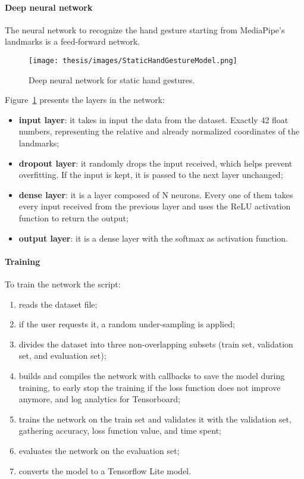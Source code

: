 \documentclass[../thesis.tex]{subfiles}
\begin{document}
\paragraph{Deep neural network}\label{p:static_hand_gesture_deep_neural_network}
The neural network to recognize the hand gesture starting from MediaPipe's landmarks is a feed-forward network.
\begin{figure}[H]
    \centering
    \texttt{[image: thesis/images/StaticHandGestureModel.png]}
    \caption{Deep neural network for static hand gestures.}
    \label{fig:static_hand_gesture_model}
\end{figure}
Figure~\ref{fig:static_hand_gesture_model} presents the layers in the network:
\begin{itemize}
    \item \textbf{input layer}: it takes in input the data from the dataset. Exactly 42 float numbers, representing the relative and already normalized coordinates of the landmarks; 
    \item \textbf{dropout layer}: it randomly drops the input received, which helps prevent overfitting. If the input is kept, it is passed to the next layer unchanged; 
    \item \textbf{dense layer}: it is a layer composed of N neurons. Every one of them takes every input received from the previous layer and uses the ReLU activation function to return the output;
    \item \textbf{output layer}: it is a dense layer with the softmax as activation function.
\end{itemize}

\paragraph{Training}\label{p:static_hand_gesture_training}
To train the network the script:
\begin{enumerate}
    \item reads the dataset file;
    \item if the user requests it, a random under-sampling is applied;
    \item divides the dataset into three non-overlapping subsets (train set, validation set, and evaluation set);
    \item builds and compiles the network with callbacks to save the model during training, to early stop the training if the loss function does not improve anymore, and log analytics for Tensorboard; 
    \item trains the network on the train set and validates it with the validation set, gathering accuracy, loss function value, and time spent;
    \item evaluates the network on the evaluation set;
    \item converts the model to a Tensorflow Lite model.
\end{enumerate}
\end{document}
